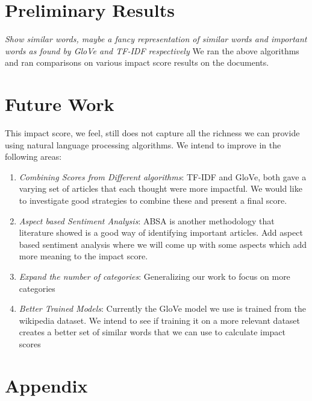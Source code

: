 \documentclass{article}
\begin{document}
\section{Preliminary Results} %
\textit{Show similar words, maybe a fancy representation of similar words and important words as found by GloVe and TF-IDF respectively}
We ran the above algorithms and ran comparisons on various impact score results on the documents.

\maketitle
\section {Future Work}
This impact score, we feel, still does not capture all the richness we can provide using natural language processing algorithms. We intend to improve in the following areas:
\begin {enumerate}
\item \textit {Combining Scores from Different algorithms}: TF-IDF and GloVe, both gave a varying set of articles that each thought were more impactful. We would like to investigate good strategies to combine these and present a final score.
\item \textit {Aspect based Sentiment Analysis}: ABSA is another methodology that literature showed is a good way of identifying important articles. Add aspect based sentiment analysis where we will come up with some aspects which add more meaning to the impact score.
\item \textit {Expand the number of categories}: Generalizing our work to focus on more categories
\item \textit {Better Trained Models}: Currently the GloVe model we use is trained from the wikipedia dataset. We intend to see if training it on a more relevant dataset creates a better set of similar words that we can use to calculate impact scores
\end {enumerate}


\maketitle
\section {Appendix}
\end{document}

